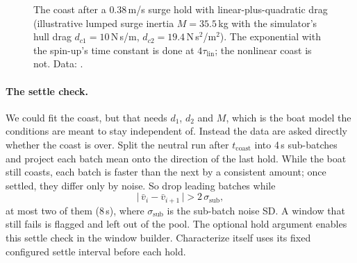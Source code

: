 \begin{figure}[ht]
\centering
{}
\caption{The coast after a $0.38$\,m/s surge hold with linear-plus-quadratic drag
(illustrative lumped surge inertia $M = 35.5$\,kg with the simulator's hull drag
$d_{c1} = 10$\,N\,s/m, $d_{c2} = 19.4$\,N\,s$^2$/m$^2$). The exponential with
the spin-up's time constant is done at $4\tau_\text{lin}$; the nonlinear coast is not.
Data: .}
\label{fig:cond-coast}
\end{figure}

\paragraph{The settle check.} We could fit the coast, but that needs $d_1$, $d_2$
and $M$, which is the boat model the conditions are meant to stay independent
of. Instead the data are asked directly whether the coast is over. Split the
neutral run after $t_\text{coast}$ into 4\,s sub-batches and project each batch
mean onto the direction of the last hold. While the boat still coasts, each batch
is faster than the next by a consistent amount; once settled, they differ only by
noise. So drop leading batches while
\[
  \big|\,\bar v_i - \bar v_{i+1}\,\big| > 2\,\sigma_\text{sub},
\]
at most two of them (8\,s), where $\sigma_\text{sub}$ is the sub-batch noise SD.
A window that still fails is flagged  and left out of the pool. The optional hold argument enables this settle check in the window builder.
Characterize itself uses its fixed configured settle interval before each hold.


